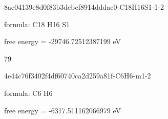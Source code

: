 \documentclass{article}
\begin{document}
\vspace{1cm}


8ae04139e8d0f83b3debcf8914dddac0-C18H16S1-1-2



formula: C18 H16 S1



free energy = -29746.72512387199 eV

79

\vspace{1cm}


4e44c76f3402f4df60740ca2d259a81f-C6H6-m1-2



formula: C6 H6



free energy = -6317.511162066979 eV
\end{document}
